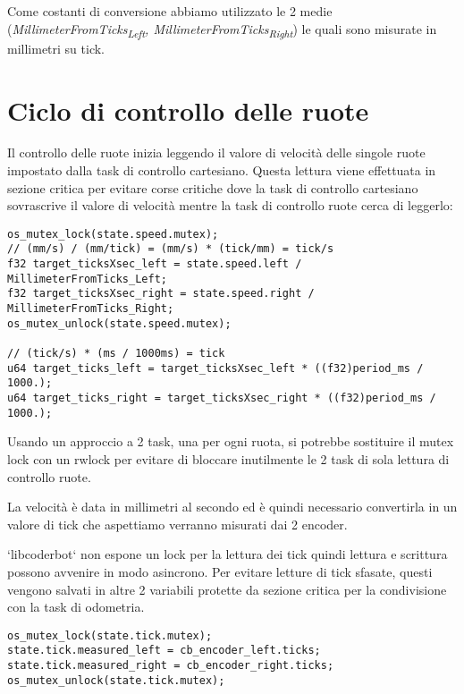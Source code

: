 \documentclass[11pt]{article}
\begin{document}
Come costanti di conversione abbiamo utilizzato le 2 medie (\emph{MillimeterFromTicks\textsubscript{Left}, MillimeterFromTicks\textsubscript{Right}}) le quali sono misurate in millimetri su tick.
\section{Ciclo di controllo delle ruote}
\label{sec:org1bd33ff}
Il controllo delle ruote inizia leggendo il valore di velocità delle singole ruote impostato dalla task di controllo cartesiano. Questa lettura viene effettuata in sezione critica per evitare corse critiche dove la task di controllo cartesiano sovrascrive il valore di velocità mentre la task di controllo ruote cerca di leggerlo:
\begin{verbatim}
os_mutex_lock(state.speed.mutex);
// (mm/s) / (mm/tick) = (mm/s) * (tick/mm) = tick/s
f32 target_ticksXsec_left = state.speed.left / MillimeterFromTicks_Left;
f32 target_ticksXsec_right = state.speed.right / MillimeterFromTicks_Right;
os_mutex_unlock(state.speed.mutex);

// (tick/s) * (ms / 1000ms) = tick
u64 target_ticks_left = target_ticksXsec_left * ((f32)period_ms / 1000.);
u64 target_ticks_right = target_ticksXsec_right * ((f32)period_ms / 1000.);
\end{verbatim}
Usando un approccio a 2 task, una per ogni ruota, si potrebbe sostituire il mutex lock con un rwlock per evitare di bloccare inutilmente le 2 task di sola lettura di controllo ruote.

La velocità è data in millimetri al secondo ed è quindi necessario convertirla in un valore di tick che aspettiamo verranno misurati dai 2 encoder.

`libcoderbot` non espone un lock per la lettura dei tick quindi lettura e scrittura possono avvenire in modo asincrono. Per evitare letture di tick sfasate, questi vengono salvati in altre 2 variabili protette da sezione critica per la condivisione con la task di odometria.
\begin{verbatim}
os_mutex_lock(state.tick.mutex);
state.tick.measured_left = cb_encoder_left.ticks;
state.tick.measured_right = cb_encoder_right.ticks;
os_mutex_unlock(state.tick.mutex);
\end{verbatim}
\end{document}
